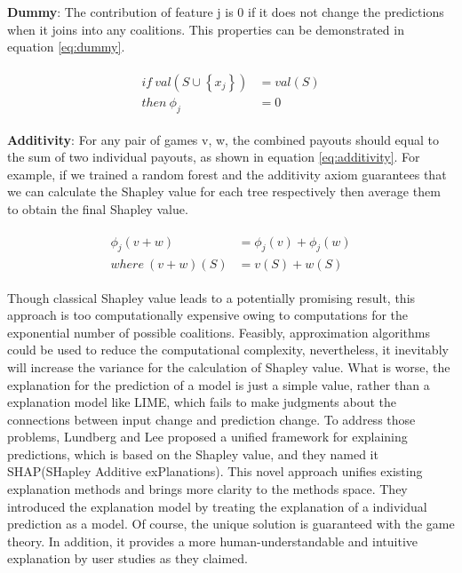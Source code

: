 \textbf{Dummy}: The contribution of feature j is 0 if it does not change the predictions when it joins into any coalitions. This properties can be demonstrated in equation \ref{eq:dummy}.

\begin{equation} \label{eq:dummy}
\begin{gathered}
\begin{aligned}
if \ val\left(S \cup\left\{x_{j}\right\}\right) &= val\left(S \right) \\
then \  \phi_{j} &= 0
\end{aligned}
\end{gathered}
\end{equation}

\textbf{Additivity}: For any pair of games v, w, the combined payouts should equal to the sum of two individual payouts, as shown in equation \ref{eq:additivity}. For example, if we trained a random forest and the additivity axiom guarantees that we can calculate the Shapley value for each tree respectively then average them to obtain the final Shapley value. 

\begin{equation} \label{eq:additivity}
\begin{gathered}
\begin{aligned}
\phi_{j}(v+w) &= \phi_{j}(v) + \phi_{j}(w) \\
where \ (v+w)(S) &= v(S) + w(S)
\end{aligned}
\end{gathered}
\end{equation}

Though classical Shapley value leads to a potentially promising result, this approach is too computationally expensive owing to computations for the exponential number of possible coalitions. Feasibly, approximation algorithms could be used to reduce the computational complexity, nevertheless, it inevitably will increase the variance for the calculation of Shapley value. What is worse, the explanation for the prediction of a model is just a simple value, rather than a explanation model like LIME, which fails to make judgments about the connections between input change and prediction change. To address those problems, Lundberg and Lee \cite{lundberg2017unified} proposed a unified framework for explaining predictions, which is based on the Shapley value, and they named it SHAP(SHapley Additive exPlanations). This novel approach unifies existing explanation methods and brings more clarity to the methods space. They introduced the explanation model by treating the explanation of a individual prediction as a model. Of course, the unique solution is guaranteed with the game theory. In addition, it provides a more human-understandable and intuitive explanation by user studies as they claimed. 

